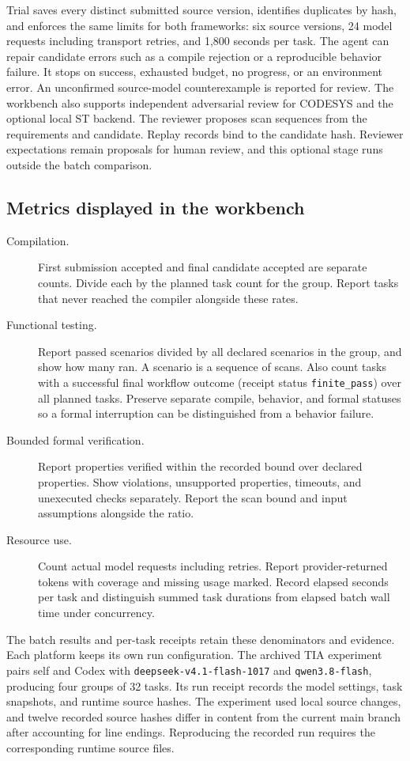 Trial saves every distinct submitted source version, identifies duplicates by hash, and enforces the same limits for both frameworks: six source versions, 24 model requests including transport retries, and 1,800 seconds per task. The agent can repair candidate errors such as a compile rejection or a reproducible behavior failure. It stops on success, exhausted budget, no progress, or an environment error. An unconfirmed source-model counterexample is reported for review. The workbench also supports independent adversarial review for CODESYS and the optional local ST backend. The reviewer proposes scan sequences from the requirements and candidate. Replay records bind to the candidate hash. Reviewer expectations remain proposals for human review, and this optional stage runs outside the batch comparison.

\subsection{Metrics displayed in the workbench}

\begin{description}
  \item[Compilation.] First submission accepted and final candidate accepted are separate counts. Divide each by the planned task count for the group. Report tasks that never reached the compiler alongside these rates.
  \item[Functional testing.] Report passed scenarios divided by all declared scenarios in the group, and show how many ran. A scenario is a sequence of scans. Also count tasks with a successful final workflow outcome (receipt status \texttt{finite\_pass}) over all planned tasks. Preserve separate compile, behavior, and formal statuses so a formal interruption can be distinguished from a behavior failure.
  \item[Bounded formal verification.] Report properties verified within the recorded bound over declared properties. Show violations, unsupported properties, timeouts, and unexecuted checks separately. Report the scan bound and input assumptions alongside the ratio.
  \item[Resource use.] Count actual model requests including retries. Report provider-returned tokens with coverage and missing usage marked. Record elapsed seconds per task and distinguish summed task durations from elapsed batch wall time under concurrency.
\end{description}

The batch results and per-task receipts retain these denominators and evidence. Each platform keeps its own run configuration. The archived TIA experiment pairs self and Codex with \texttt{deepseek-v4.1-flash-1017} and \texttt{qwen3.8-flash}, producing four groups of 32 tasks. Its run receipt records the model settings, task snapshots, and runtime source hashes. The experiment used local source changes, and twelve recorded source hashes differ in content from the current main branch after accounting for line endings. Reproducing the recorded run requires the corresponding runtime source files.
